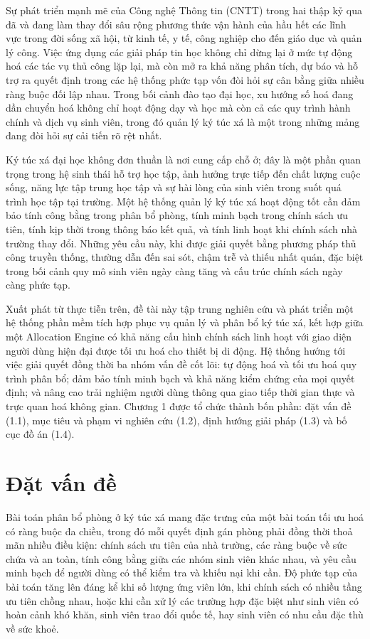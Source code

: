 \documentclass[../DoAn.tex]{subfiles}
\begin{document}
Sự phát triển mạnh mẽ của Công nghệ Thông tin (CNTT) trong hai thập kỷ qua đã
và đang làm thay đổi sâu rộng phương thức vận hành của hầu hết các lĩnh vực
trong đời sống xã hội, từ kinh tế, y tế, công nghiệp cho đến giáo dục và quản
lý công. Việc ứng dụng các giải pháp tin học không chỉ dừng lại ở mức tự động
hoá các tác vụ thủ công lặp lại, mà còn mở ra khả năng phân tích, dự báo và hỗ
trợ ra quyết định trong các hệ thống phức tạp vốn đòi hỏi sự cân bằng giữa
nhiều ràng buộc đối lập nhau. Trong bối cảnh đào tạo đại học, xu hướng số hoá
đang dần chuyển hoá không chỉ hoạt động dạy và học mà còn cả các quy trình hành
chính và dịch vụ sinh viên, trong đó quản lý ký túc xá là một trong những mảng
đang đòi hỏi sự cải tiến rõ rệt nhất.

Ký túc xá đại học không đơn thuần là nơi cung cấp chỗ ở; đây là một phần quan
trọng trong hệ sinh thái hỗ trợ học tập, ảnh hưởng trực tiếp đến chất lượng
cuộc sống, năng lực tập trung học tập và sự hài lòng của sinh viên trong suốt
quá trình học tập tại trường. Một hệ thống quản lý ký túc xá hoạt động tốt cần
đảm bảo tính công bằng trong phân bổ phòng, tính minh bạch trong chính sách ưu
tiên, tính kịp thời trong thông báo kết quả, và tính linh hoạt khi chính sách
nhà trường thay đổi. Những yêu cầu này, khi được giải quyết bằng phương pháp
thủ công truyền thống, thường dẫn đến sai sót, chậm trễ và thiếu nhất quán,
đặc biệt trong bối cảnh quy mô sinh viên ngày càng tăng và cấu trúc chính sách
ngày càng phức tạp.

Xuất phát từ thực tiễn trên, đề tài này tập trung nghiên cứu và phát triển một
hệ thống phần mềm tích hợp phục vụ quản lý và phân bổ ký túc xá, kết hợp giữa
một Allocation Engine có khả năng cấu hình chính sách linh hoạt với giao diện
người dùng hiện đại được tối ưu hoá cho thiết bị di động. Hệ thống hướng tới
việc giải quyết đồng thời ba nhóm vấn đề cốt lõi: tự động hoá và tối ưu hoá
quy trình phân bổ; đảm bảo tính minh bạch và khả năng kiểm chứng của mọi quyết
định; và nâng cao trải nghiệm người dùng thông qua giao tiếp thời gian thực và
trực quan hoá không gian. Chương 1 được tổ chức thành bốn phần: đặt vấn đề
(1.1), mục tiêu và phạm vi nghiên cứu (1.2), định hướng giải pháp (1.3) và bố
cục đồ án (1.4).

\section{Đặt vấn đề}
\label{section:1.1}

Bài toán phân bổ phòng ở ký túc xá mang đặc trưng của một bài toán tối ưu hoá
có ràng buộc đa chiều, trong đó mỗi quyết định gán phòng phải đồng thời thoả
mãn nhiều điều kiện: chính sách ưu tiên của nhà trường, các ràng buộc về sức
chứa và an toàn, tính công bằng giữa các nhóm sinh viên khác nhau, và yêu cầu
minh bạch để người dùng có thể kiểm tra và khiếu nại khi cần. Độ phức tạp của
bài toán tăng lên đáng kể khi số lượng ứng viên lớn, khi chính sách có nhiều
tầng ưu tiên chồng nhau, hoặc khi cần xử lý các trường hợp đặc biệt như sinh
viên có hoàn cảnh khó khăn, sinh viên trao đổi quốc tế, hay sinh viên có nhu
cầu đặc thù về sức khoẻ.
\end{document}

